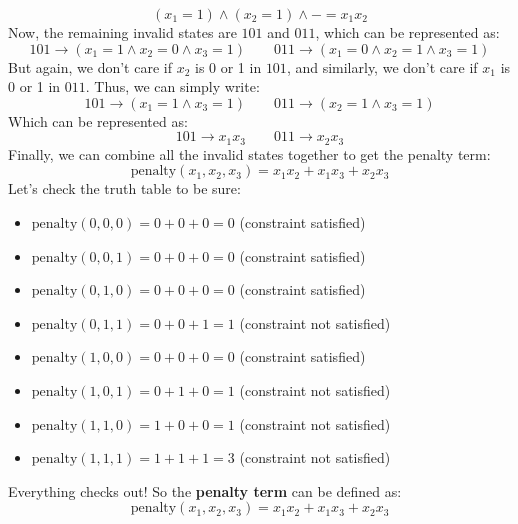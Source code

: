 \begin{examplebox}[: $x_{1} + x_{2} + x_{3} \le 1$]
    \begin{equation*}
        \left(x_1 = 1\right) \land \left(x_2 = 1\right) \land - = x_1 x_2
    \end{equation*}
    Now, the remaining invalid states are $101$ and $011$, which can be represented as:
    \begin{equation*}
        101 \to \left(x_1 = 1 \land x_2 = 0 \land x_3 = 1\right) \qquad 011 \to \left(x_1 = 0 \land x_2 = 1 \land x_3 = 1\right)
    \end{equation*}
    But again, we don't care if $x_2$ is 0 or 1 in $101$, and similarly, we don't care if $x_1$ is 0 or 1 in $011$. Thus, we can simply write:
    \begin{equation*}
        101 \to \left(x_1 = 1 \land x_3 = 1\right) \qquad 011 \to \left(x_2 = 1 \land x_3 = 1\right)
    \end{equation*}
    Which can be represented as:
    \begin{equation*}
        101 \to x_1 x_3 \qquad 011 \to x_2 x_3
    \end{equation*}
    Finally, we can combine all the invalid states together to get the penalty term:
    \begin{equation*}
        \text{penalty}(x_1, x_2, x_3) = x_1 x_2 + x_1 x_3 + x_2 x_3
    \end{equation*}
    Let's check the truth table to be sure:
    \begin{itemize}
        \item $\text{penalty}(0, 0, 0) = 0 + 0 + 0 = 0$ (constraint satisfied)
        \item $\text{penalty}(0, 0, 1) = 0 + 0 + 0 = 0$ (constraint satisfied)
        \item $\text{penalty}(0, 1, 0) = 0 + 0 + 0 = 0$ (constraint satisfied)
        \item $\text{penalty}(0, 1, 1) = 0 + 0 + 1 = 1$ (constraint not satisfied)
        \item $\text{penalty}(1, 0, 0) = 0 + 0 + 0 = 0$ (constraint satisfied)
        \item $\text{penalty}(1, 0, 1) = 0 + 1 + 0 = 1$ (constraint not satisfied)
        \item $\text{penalty}(1, 1, 0) = 1 + 0 + 0 = 1$ (constraint not satisfied)
        \item $\text{penalty}(1, 1, 1) = 1 + 1 + 1 = 3$ (constraint not satisfied)
    \end{itemize}
    Everything checks out! So the \textbf{penalty term} can be defined as:
    \begin{equation*}
        \text{penalty}(x_1, x_2, x_3) = x_1 x_2 + x_1 x_3 + x_2 x_3
    \end{equation*}
\end{examplebox}

